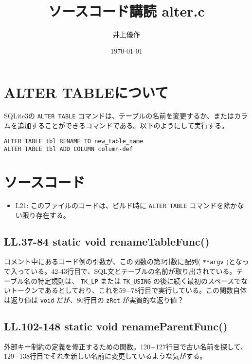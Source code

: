 \documentclass{ltjsarticle}
\author{井上優作}
\date{\today}
\title{ソースコード講読 alter.c}
\begin{document}
\maketitle

\section*{ALTER TABLEについて}
\label{sec-1}

SQLite3の \verb~ALTER TABLE~ コマンドは、テーブルの名前を変更するか、またはカラムを追加することができるコマンドである。以下のようにして実行する。

\begin{verbatim}
ALTER TABLE tbl RENAME TO new_table_name
ALTER TABLE tbl ADD COLUMN column-def
\end{verbatim}

\section*{ソースコード}
\label{sec-2}

\begin{itemize}
\item L21: このファイルのコードは、ビルド時に \verb~ALTER TABLE~ コマンドを除かない限り存在する。
\end{itemize}

\subsection*{LL.37-84 static void renameTableFunc()}
\label{sec-2-1}

コメント中にあるコード例の引数が、この関数の第3引数に配列( \verb~**argv~ )となって入っている。42-43行目で、SQL文とテーブルの名前が取り出されている。テーブル名の特定規則は、 \verb~TK_LP~ または \verb~TK_USING~ の後に続く最初のスペースでないトークンであるとしており、これを59−78行目で実行している。この関数自体は返り値は \verb~void~ だが、80行目の \verb~zRet~ が実質的な返り値？　

\subsection*{LL.102-148 static void renameParentFunc()}
\label{sec-2-2}

外部キー制約の定義を修正するための関数。120−127行目で古い名前を探して、129−138行目でそれを新しい名前に変更しているような気がする。
\end{document}
